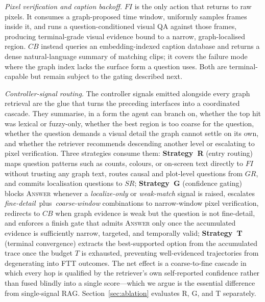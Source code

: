 \documentclass[sigconf, screen, review, anonymous]{acmart}
\begin{document}
\begin{sloppypar}
\emph{Pixel verification and caption backoff.}\quad
$FI$ is the only action that returns to raw pixels.  It consumes a
graph-proposed time window, uniformly samples frames inside it, and runs a
question-conditioned visual QA against those frames, producing
terminal-grade visual evidence bound to a narrow, graph-localised region.
$CB$ instead queries an embedding-indexed caption database and returns a
dense natural-language summary of matching clips; it covers the failure
mode where the graph index lacks the surface form a question uses.  Both
are terminal-capable but remain subject to the gating described next.

\emph{Controller-signal routing.}\quad
The controller signals emitted alongside every graph retrieval are the
glue that turns the preceding interfaces into a coordinated cascade.  They
summarise, in a form the agent can branch on, whether the top hit was
lexical or fuzzy-only, whether the best region is too coarse for the
question, whether the question demands a visual detail the graph cannot
settle on its own, and whether the retriever recommends descending another
level or escalating to pixel verification.  Three strategies consume them:
\textbf{Strategy~R} (entry routing) maps question patterns such as counts,
colours, or on-screen text directly to $FI$ without trusting any graph
text, routes causal and plot-level questions from $GR$, and commits
localisation questions to $SR$;
\textbf{Strategy~G} (confidence gating) blocks \textsc{Answer} whenever a
\emph{localize-only} or \emph{weak-match} signal is raised, escalates
\emph{fine-detail}~plus~\emph{coarse-window} combinations to narrow-window
pixel verification, redirects to $CB$ when graph evidence is weak but the
question is not fine-detail, and enforces a finish gate that admits
\textsc{Answer} only once the accumulated evidence is sufficiently narrow,
targeted, and temporally valid;
\textbf{Strategy~T} (terminal convergence) extracts the best-supported
option from the accumulated trace once the budget $T$ is exhausted,
preventing well-evidenced trajectories from degenerating into FTT
outcomes.  The net effect is a coarse-to-fine cascade in which every hop
is qualified by the retriever's own self-reported confidence rather than
fused blindly into a single score---which we argue is the essential
difference from single-signal RAG.  Section~\ref{sec:ablation} evaluates
R, G, and T separately.
\end{sloppypar}


\end{document}
